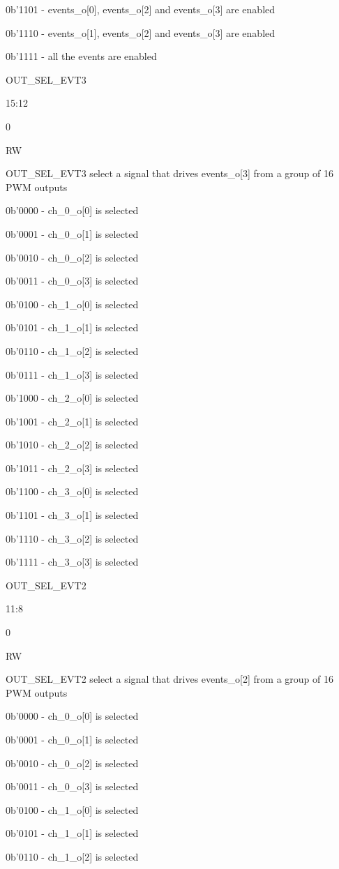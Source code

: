 0b’1101 - events_o[0], events_o[2] and events_o[3] are enabled

0b’1110 - events_o[1], events_o[2] and events_o[3] are enabled

0b’1111 - all the events are enabled

OUT_SEL_EVT3
	

15:12
	

0
	

RW
	

OUT_SEL_EVT3 select a signal that drives events_o[3] from a group of 16 PWM outputs

0b’0000 - ch_0_o[0] is selected

0b’0001 - ch_0_o[1] is selected

0b’0010 - ch_0_o[2] is selected

0b’0011 - ch_0_o[3] is selected

0b’0100 - ch_1_o[0] is selected

0b’0101 - ch_1_o[1] is selected

0b’0110 - ch_1_o[2] is selected

0b’0111 - ch_1_o[3] is selected

0b’1000 - ch_2_o[0] is selected

0b’1001 - ch_2_o[1] is selected

0b’1010 - ch_2_o[2] is selected

0b’1011 - ch_2_o[3] is selected

0b’1100 - ch_3_o[0] is selected

0b’1101 - ch_3_o[1] is selected

0b’1110 - ch_3_o[2] is selected

0b’1111 - ch_3_o[3] is selected

OUT_SEL_EVT2
	

11:8
	

0
	

RW
	

OUT_SEL_EVT2 select a signal that drives events_o[2] from a group of 16 PWM outputs

0b’0000 - ch_0_o[0] is selected

0b’0001 - ch_0_o[1] is selected

0b’0010 - ch_0_o[2] is selected

0b’0011 - ch_0_o[3] is selected

0b’0100 - ch_1_o[0] is selected

0b’0101 - ch_1_o[1] is selected

0b’0110 - ch_1_o[2] is selected

